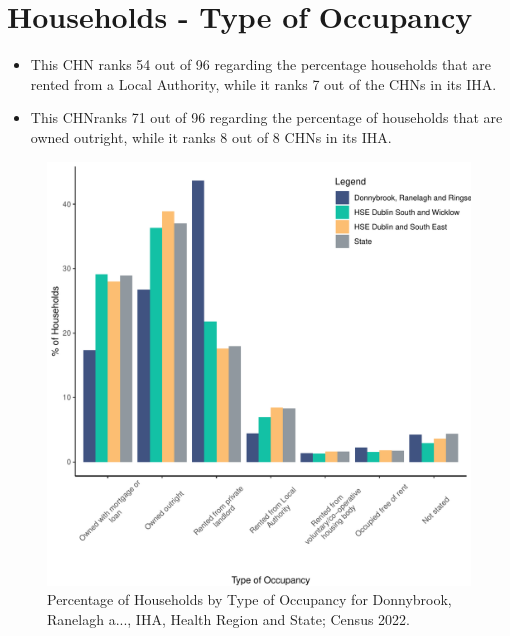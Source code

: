 \documentclass{article}
\begin{document}
\section{Households - Type of Occupancy}\label{sect:Households}
\begin{itemize}
\item This CHN ranks  54 out of 96 regarding the percentage households that are rented from a Local Authority, while it ranks  7 out of the CHNs in its IHA. 
\item This CHNranks  71 out of 96 regarding the percentage of households that are owned outright, while it ranks   8 out of 8 CHNs in its IHA.
\end{itemize}
\begin{figure}[H]
	\centering
	\includegraphics[width = 140mm]{../figures/HouseholdsED.pdf}
	\caption{Percentage of Households by Type of Occupancy for Donnybrook, Ranelagh a..., IHA, Health Region and State; Census 2022.}
	\label{fig:vbnv}
	\end{figure}
\end{document}
